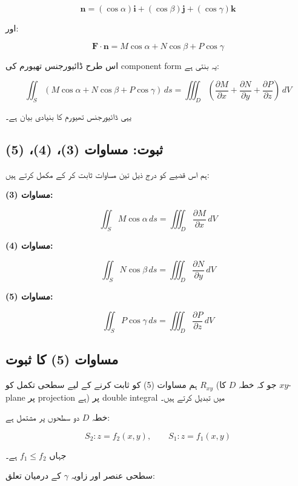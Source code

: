 \begin{enumerate}
\[
\mathbf{n}
=
(\cos \alpha)\mathbf{i}
+
(\cos \beta)\mathbf{j}
+
(\cos \gamma)\mathbf{k}
\]

اور:

\[
\mathbf{F}\cdot \mathbf{n}
=
M\cos\alpha + N\cos\beta + P\cos\gamma
\]

\bigskip

اس طرح ڈائیورجنس تھیورم کی component form یہ بنتی ہے:

\[
\iint_S (M\cos\alpha + N\cos\beta + P\cos\gamma)\, ds
=
\iiint_D \left(
\frac{\partial M}{\partial x}
+
\frac{\partial N}{\partial y}
+
\frac{\partial P}{\partial z}
\right)\, dV
\]

یہی ڈائیورجنس تھیورم کا بنیادی بیان ہے۔


\subsection*{ثبوت: مساوات (3)، (4)، (5)}

ہم اس قضیے کو درج ذیل تین مساوات ثابت کر کے مکمل کرتے ہیں:

\bigskip

\textbf{مساوات (3):}

\[
\iint_S M \cos \alpha \, ds
=
\iiint_D \frac{\partial M}{\partial x}\, dV
\tag{3}
\]

\textbf{مساوات (4):}

\[
\iint_S N \cos \beta \, ds
=
\iiint_D \frac{\partial N}{\partial y}\, dV
\tag{4}
\]

\textbf{مساوات (5):}

\[
\iint_S P \cos \gamma \, ds
=
\iiint_D \frac{\partial P}{\partial z}\, dV
\tag{5}
\]

\bigskip

\subsection*{مساوات (5) کا ثبوت}

ہم مساوات (5) کو ثابت کرنے کے لیے سطحی تکمل کو \( R_{xy} \) (جو کہ خطہ \( D \) کا \( xy \)-plane پر projection ہے) پر double integral میں تبدیل کرتے ہیں۔

خطہ \( D \) دو سطحوں پر مشتمل ہے:

\[
S_2: z = f_2(x,y), \qquad
S_1: z = f_1(x,y)
\]

جہاں \( f_1 \le f_2 \) ہے۔

\bigskip

سطحی عنصر اور زاویہ \( \gamma \) کے درمیان تعلق:


\end{enumerate}
